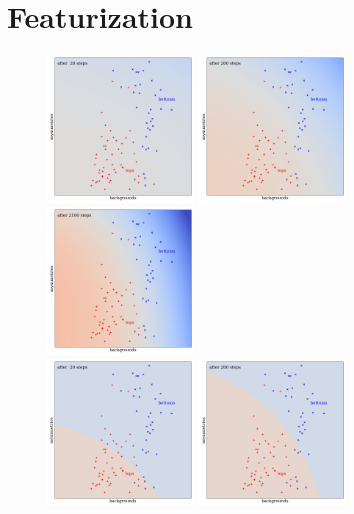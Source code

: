 \documentclass[openany, notitlepage, justified]{tufte-book}
\begin{document}
        \section{Featurization}
            \begin{figure}
                \centering
                \includegraphics[height=3.9cm]{yo-00-sm}
                \includegraphics[height=3.9cm]{yo-03-sm}
                \includegraphics[height=3.9cm]{yo-13-sm}\\
                \includegraphics[height=3.9cm]{yo-00-bd}
                \includegraphics[height=3.9cm]{yo-03-bd}

\end{figure}
\end{document}
